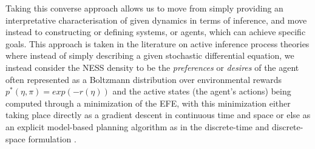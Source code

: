 Taking this converse approach allows us to move from simply providing an interpretative characterisation of given dynamics in terms of inference, and move instead to constructing or defining systems, or agents, which can achieve specific goals. This approach is taken in the literature on active inference process theories \citep{friston2012active,friston2015active,friston2017active,da2020active} where instead of simply describing a given stochastic differential equation, we instead consider the NESS density to be the \emph{preferences} or \emph{desires} of the agent often represented as a Boltzmann distribution over environmental rewards $p^*(\eta,\pi) = exp(-r(\eta))$ and the active states (the agent's actions) being computed through a minimization of the EFE, with this minimization either taking place directly as a gradient descent in continuous time and space \citep{friston2009reinforcement} or else as an explicit model-based planning algorithm as in the discrete-time and discrete-space formulation \citep{friston2017process,tschantz2020reinforcement,millidge_deep_2019,millidge2020relationship}.

